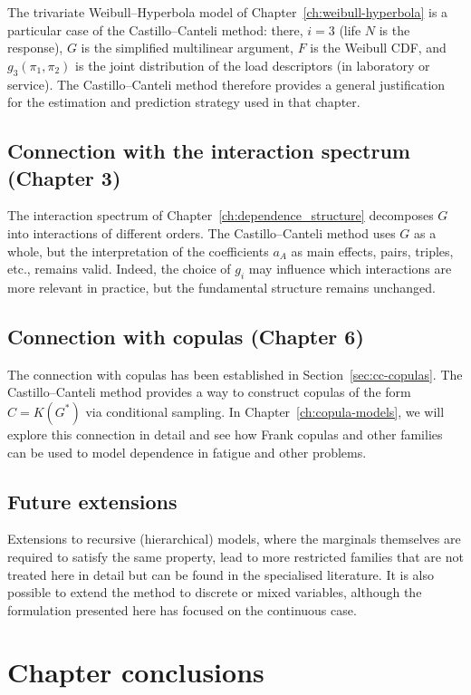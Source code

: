 The trivariate Weibull–Hyperbola model of Chapter~\ref{ch:weibull-hyperbola} is a particular case of the Castillo–Canteli method: there, \(i=3\) (life \(N\) is the response), \(G\) is the simplified multilinear argument, \(F\) is the Weibull CDF, and \(g_3(\pi_1,\pi_2)\) is the joint distribution of the load descriptors (in laboratory or service). The Castillo–Canteli method therefore provides a general justification for the estimation and prediction strategy used in that chapter.

\subsection{Connection with the interaction spectrum (Chapter 3)}

The interaction spectrum of Chapter~\ref{ch:dependence_structure} decomposes \(G\) into interactions of different orders. The Castillo–Canteli method uses \(G\) as a whole, but the interpretation of the coefficients \(a_A\) as main effects, pairs, triples, etc., remains valid. Indeed, the choice of \(g_i\) may influence which interactions are more relevant in practice, but the fundamental structure remains unchanged.

\subsection{Connection with copulas (Chapter 6)}

The connection with copulas has been established in Section~\ref{sec:cc-copulas}. The Castillo–Canteli method provides a way to construct copulas of the form \(C=K(G^*)\) via conditional sampling. In Chapter~\ref{ch:copula-models}, we will explore this connection in detail and see how Frank copulas and other families can be used to model dependence in fatigue and other problems.

\subsection{Future extensions}

Extensions to recursive (hierarchical) models, where the marginals themselves are required to satisfy the same property, lead to more restricted families that are not treated here in detail but can be found in the specialised literature. It is also possible to extend the method to discrete or mixed variables, although the formulation presented here has focused on the continuous case.

\section*{Chapter conclusions}

